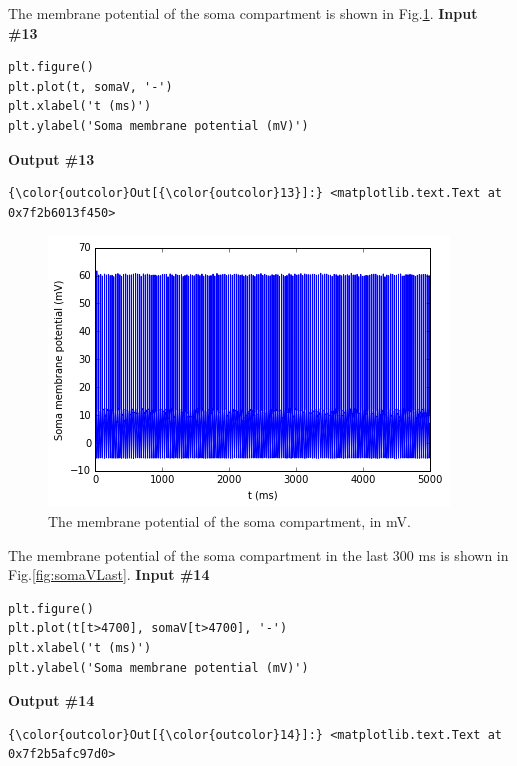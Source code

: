 \documentclass{article}
\makeatletter
\def\maxwidth{\ifdim\Gin@nat@width>\linewidth\linewidth
    \else\Gin@nat@width\fi}
\let\Oldincludegraphics\includegraphics
\renewcommand{\includegraphics}[1]{\Oldincludegraphics[width=.8\maxwidth]{#1}}
\makeatother
\begin{document}
    The membrane potential of the soma compartment is shown in
Fig.\ref{fig:somaV}.
\newline\textbf{Input \#{}13}\begin{verbatim}
plt.figure()
plt.plot(t, somaV, '-')
plt.xlabel('t (ms)')
plt.ylabel('Soma membrane potential (mV)')
\end{verbatim}\textbf{Output \#{}13}
            \begin{Verbatim}[commandchars=\\\{\}]
{\color{outcolor}Out[{\color{outcolor}13}]:} <matplotlib.text.Text at 0x7f2b6013f450>
\end{Verbatim}
        
    \begin{figure}
        \begin{center}
        \includegraphics{MNPoolWithDescendingCommand_files/MNPoolWithDescendingCommand_20_1.png}
        \end{center}
        \caption{The membrane potential of the soma compartment, in mV.}
        \label{fig:somaV}
    \end{figure}
    
    The membrane potential of the soma compartment in the last 300 ms is
shown in Fig.\ref{fig:somaVLast}.
\newline\textbf{Input \#{}14}\begin{verbatim}
plt.figure()
plt.plot(t[t>4700], somaV[t>4700], '-')
plt.xlabel('t (ms)')
plt.ylabel('Soma membrane potential (mV)')
\end{verbatim}\textbf{Output \#{}14}
            \begin{Verbatim}[commandchars=\\\{\}]
{\color{outcolor}Out[{\color{outcolor}14}]:} <matplotlib.text.Text at 0x7f2b5afc97d0>
\end{Verbatim}
        
\end{document}
